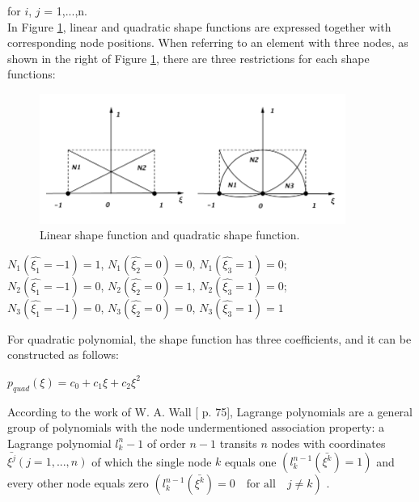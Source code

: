 for $i$, $j$ = 1,...,n. \\
In Figure \ref{fig: shape_func}, linear and quadratic shape functions are expressed together with corresponding node positions. When referring to an element with three nodes, as shown in the right of Figure \ref{fig: shape_func}, there are three restrictions for each shape functions:

\begin{figure}
	\begin{center}
		\includegraphics[width=10cm,clip]{shape_func.pdf} 		
		\caption{Linear shape function and quadratic shape function.} \label{fig: shape_func}	
	\end{center}
\end{figure}

\begin{center}
	$N_1\left(\hat{\xi_1} = -1\right) = 1$, $N_1\left(\hat{\xi_2} = 0\right) = 0$, $N_1\left(\hat{\xi_3} = 1\right) = 0$;\\
	$N_2\left(\hat{\xi_1} = -1\right) = 0$, $N_2\left(\hat{\xi_2} = 0\right) = 1$, $N_2\left(\hat{\xi_3} = 1\right) = 0$;\\
	$N_3\left(\hat{\xi_1} = -1\right) = 0$, $N_3\left(\hat{\xi_2} = 0\right) = 0$, $N_3\left(\hat{\xi_3} = 1\right) = 1$
\end{center}
For quadratic polynomial, the shape function has three coefficients, and it can be constructed as follows:
\begin{center}
	$p_{quad}\left(\xi\right) = c_0 + c_1\xi + c_2\xi^2$
\end{center}
According to the work of W. A. Wall [\cite{FiniteElement} p. 75], Lagrange polynomials are a general group of polynomials with the node undermentioned association property: a Lagrange polynomial $l_k^n-1$ of order $n-1$ transits $n$ nodes with coordinates $\bar{\xi^j}\left(j = 1,...,n\right)$ of which the single node $k$ equals one $\left(l_k^{n-1} \left(\bar{\xi^k}\right)=1\right)$ and every other node equals zero $\left(l_k^{n-1} \left(\bar{\xi^k}\right)=0  \quad \text{for all} \quad j \neq k\right)$ .

